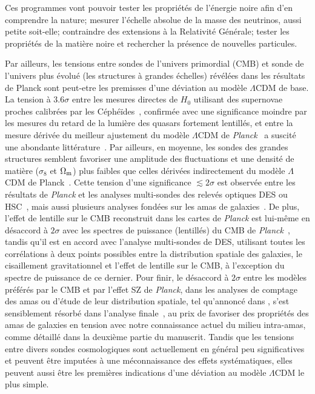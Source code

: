 Ces programmes vont pouvoir tester les propriétés de l'énergie
noire afin d'en comprendre la nature; mesurer l'échelle absolue de la
masse des neutrinos, aussi petite soit-elle; contraindre des
extensions à la Relativité Générale; tester les propriétés de la
matière noire et rechercher la présence de nouvelles particules.

Par ailleurs, les tensions entre sondes de l'univers primordial (CMB)
et sonde de l'univers plus évolué (les structures à grandes échelles)
révélées dans les résultats de Planck sont peut-etre les premisses
d'une déviation au modèle $\Lambda$CDM de base.
La tension à 3.6$\sigma$ entre les mesures directes de $H_{0}$ utilisant
des supernovae proches calibrées par les
Céphéïdes~\citep[\emph{e.g.}][]{Riess2018}, confirmée avec une
significance moindre par les mesures du retard de la lumière des
quasars fortement lentillés, et entre la mesure dérivée du
meilleur ajustement du modèle $\Lambda$CDM
de \emph{Planck}~\citep{Planck_2018_cosmo} a suscité une abondante
littérature~\citep[voir par exemple][pour un
résumé]{Verde2019}. Par ailleurs, en moyenne, les sondes des grandes
structures semblent favoriser une amplitude des fluctuations et une
densité de matière ($\sigma_8$ et $\Omega_{\rm{m}}$) plus faibles que
celles dérivées indirectement du modèle $\Lambda$CDM de
Planck~\citep[voir][pour une revue]{Pratt2019}. Cette tension d'une
significance $\lesssim 2\sigma$ est observée entre les résultats de
\emph{Planck} et les analyses multi-sondes des relevés optiques DES ou
HSC~\citep[\emph{e.g.}][]{DES2019_cosmo},
mais aussi plusieurs analyses fondées sur les amas de
galaxies~\citep[\emph{e.g.}][]{Bocquet2019}.
De plus, l'effet de lentille sur le CMB reconstruit dans les cartes
de \emph{Planck} est lui-même en désaccord à $2\sigma$ avec les
spectres de puissance (lentillés) du CMB
de \emph{Planck}~\citep{Planck_2018_cosmo}, tandis qu'il est en accord 
avec l'analyse multi-sondes de DES, utilisant toutes les
corrélations à deux points possibles entre la distribution spatiale
des galaxies, le cisaillement gravitationnel et l'effet de lentille
sur le CMB, à l'exception du spectre de puissance de ce
dernier\citet{DES2019_cosmo}.
Pour finir, le désaccord à $2\sigma$ entre les modèles préférés par le
CMB et par l'effet SZ de \emph{Planck}, dans les analyses de comptage
des amas ou d'étude de leur distribution spatiale, tel
qu'annoncé dans \citet{Planck_2014_SZ_Cosmo, Planck_2014_ymap,
Planck_2016_SZ_cosmo, Planck2016_ymap}, s'est sensiblement résorbé
dans l'analyse finale~\citep{Planck_2018_cosmo, Zulbedia2019,
Salvati2018}, au prix de favoriser des propriétés des amas de galaxies
en tension avec notre connaissance actuel du milieu intra-amas, comme
détaillé dans la deuxième partie du manuscrit. Tandis que les tensions
entre divers sondes cosmologiques sont actuellement en général peu
significatives et peuvent être imputées à une méconnaissance des
effets systématiques, elles peuvent aussi être les premières
indications d'une déviation au modèle $\Lambda$CDM le plus simple.\\


